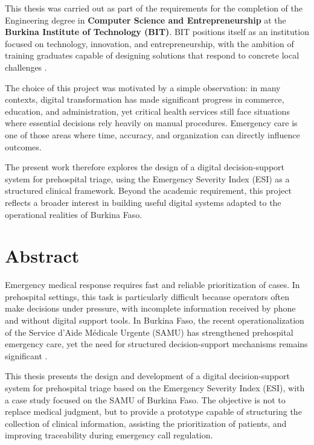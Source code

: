 \documentclass[a4paper,12pt,oneside]{report}
\begin{document}
This thesis was carried out as part of the requirements for the completion of the Engineering degree in \textbf{Computer Science and Entrepreneurship} at the \textbf{Burkina Institute of Technology (BIT)}. BIT positions itself as an institution focused on technology, innovation, and entrepreneurship, with the ambition of training graduates capable of designing solutions that respond to concrete local challenges \cite{bitsite}.

The choice of this project was motivated by a simple observation: in many contexts, digital transformation has made significant progress in commerce, education, and administration, yet critical health services still face situations where essential decisions rely heavily on manual procedures. Emergency care is one of those areas where time, accuracy, and organization can directly influence outcomes.

The present work therefore explores the design of a digital decision-support system for prehospital triage, using the Emergency Severity Index (ESI) as a structured clinical framework. Beyond the academic requirement, this project reflects a broader interest in building useful digital systems adapted to the operational realities of Burkina Faso.

\clearpage

\section*{Abstract}
\justifying

Emergency medical response requires fast and reliable prioritization of cases. In prehospital settings, this task is particularly difficult because operators often make decisions under pressure, with incomplete information received by phone and without digital support tools. In Burkina Faso, the recent operationalization of the Service d'Aide M\'edicale Urgente (SAMU) has strengthened prehospital emergency care, yet the need for structured decision-support mechanisms remains significant \cite{ministry2024_urgences,ministry2024_garde}.

This thesis presents the design and development of a digital decision-support system for prehospital triage based on the Emergency Severity Index (ESI), with a case study focused on the SAMU of Burkina Faso. The objective is not to replace medical judgment, but to provide a prototype capable of structuring the collection of clinical information, assisting the prioritization of patients, and improving traceability during emergency call regulation.
\end{document}
